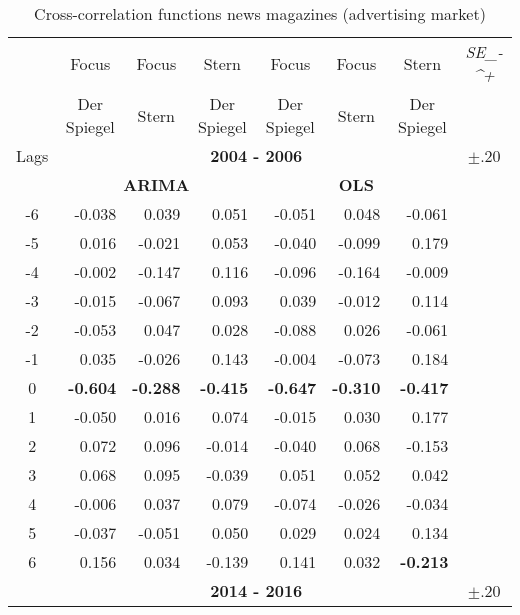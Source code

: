 \documentclass[10pt,a4paper]{scrreprt}
\begin{document}
\begin{table}[htbp]
  \centering
  \caption{Cross-correlation functions news magazines (advertising market)}
    \begin{tabular}{crrr|rrrr}
    \toprule
    \toprule
          & \multicolumn{1}{c}{Focus} & \multicolumn{1}{c}{Focus} & \multicolumn{1}{c}{Stern} & \multicolumn{1}{c}{Focus} & \multicolumn{1}{c}{Focus} & \multicolumn{1}{c}{Stern} & \multicolumn{1}{c}{\textit{SE_-^+}} \\
          & \multicolumn{1}{c}{Der Spiegel} & \multicolumn{1}{c}{Stern} & \multicolumn{1}{c}{Der Spiegel} & \multicolumn{1}{c}{Der Spiegel} & \multicolumn{1}{c}{Stern} & \multicolumn{1}{c}{Der Spiegel} &  \\
    \midrule
    Lags  & \multicolumn{6}{c}{\textbf{2004 - 2006}}      & \multicolumn{1}{c}{$\pm$.20} \\
    \midrule
          & \multicolumn{3}{c|}{\textbf{ARIMA}} & \multicolumn{3}{c}{\textbf{OLS}} &  \\
    -6    & -0.038 & 0.039 & 0.051 & -0.051 & 0.048 & -0.061 &  \\
    -5    & 0.016 & -0.021 & 0.053 & -0.040 & -0.099 & 0.179 &  \\
    -4    & -0.002 & -0.147 & 0.116 & -0.096 & -0.164 & -0.009 &  \\
    -3    & -0.015 & -0.067 & 0.093 & 0.039 & -0.012 & 0.114 &  \\
    -2    & -0.053 & 0.047 & 0.028 & -0.088 & 0.026 & -0.061 &  \\
    -1    & 0.035 & -0.026 & 0.143 & -0.004 & -0.073 & 0.184 &  \\
    0     & \textbf{-0.604} & \textbf{-0.288} & \textbf{-0.415} & \textbf{-0.647} & \textbf{-0.310} & \textbf{-0.417} &  \\
    1     & -0.050 & 0.016 & 0.074 & -0.015 & 0.030 & 0.177 &  \\
    2     & 0.072 & 0.096 & -0.014 & -0.040 & 0.068 & -0.153 &  \\
    3     & 0.068 & 0.095 & -0.039 & 0.051 & 0.052 & 0.042 &  \\
    4     & -0.006 & 0.037 & 0.079 & -0.074 & -0.026 & -0.034 &  \\
    5     & -0.037 & -0.051 & 0.050 & 0.029 & 0.024 & 0.134 &  \\
    6     & 0.156 & 0.034 & -0.139 & 0.141 & 0.032 & \textbf{-0.213} &  \\
    \midrule
    \multicolumn{1}{|r}{} & \multicolumn{6}{c}{\textbf{2014 - 2016}}      & \multicolumn{1}{c}{$\pm$.20} \\

\end{tabular}
\end{table}
\end{document}
